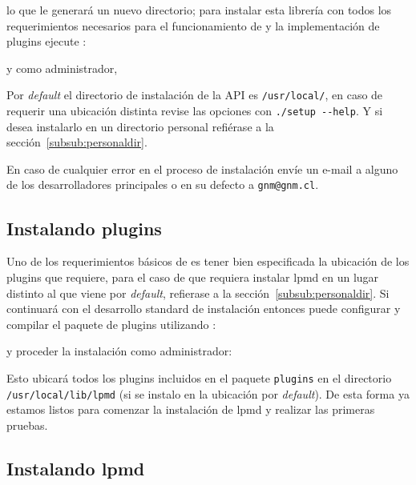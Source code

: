
lo que le generar\'a un nuevo directorio; para instalar esta librer\'ia con todos los requerimientos necesarios para el funcionamiento de {\lpmd} y la implementaci\'on de plugins ejecute :


y como administrador,


Por \textit{default} el directorio de instalaci\'on de la API es \verb|/usr/local/|, en caso de requerir una ubicaci\'on distinta revise las opciones con \verb|./setup --help|. Y si desea instalarlo en un directorio personal refi\'erase a la secci\'on~\ref{subsub:personaldir}.

En caso de cualquier error en el proceso de instalaci\'on env\'ie un e-mail a alguno de los desarrolladores principales o en su defecto a \verb|gnm@gnm.cl|.

\subsection{Instalando plugins}

Uno de los requerimientos b\'asicos de {\lpmd} es tener bien especificada la ubicaci\'on de los plugins que {\lpmd} requiere, para el caso de que requiera instalar lpmd en un lugar distinto al que viene por \textit{default}, refierase a la secci\'on~\ref{subsub:personaldir}. Si continuará con el desarrollo standard de instalaci\'on entonces puede configurar y compilar el paquete de plugins utilizando :


y proceder la instalaci\'on como administrador:


Esto ubicar\'a todos los plugins incluidos en el paquete \verb|plugins| en el directorio \verb|/usr/local/lib/lpmd| (si se instalo en la ubicaci\'on por \textit{default}). De esta forma ya estamos listos para comenzar la instalaci\'on de lpmd y realizar las primeras pruebas.

\subsection{Instalando lpmd}

